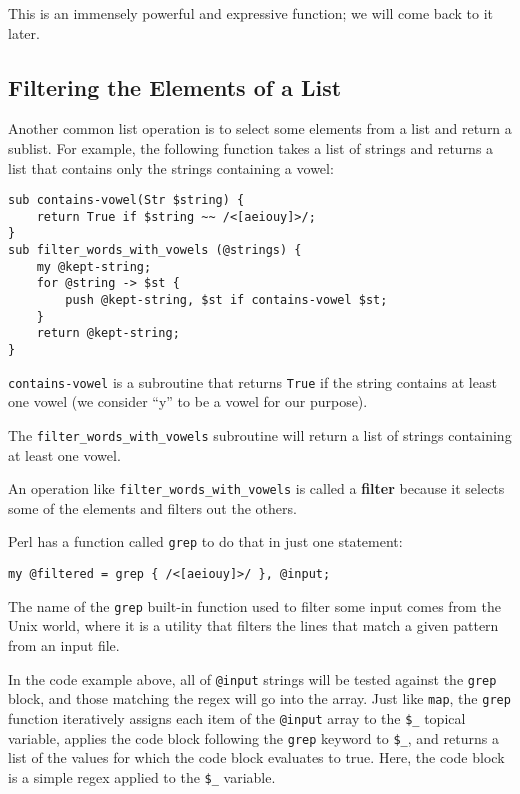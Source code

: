 This is an immensely 
powerful and expressive function; we will come back to it 
later.

\subsection{Filtering the Elements of a List}

Another common list operation is to select some elements from
a list and return a sublist.  For example, the following
function takes a list of strings and returns a list that 
contains only the strings containing a vowel:

\begin{verbatim}
sub contains-vowel(Str $string) {
    return True if $string ~~ /<[aeiouy]>/;
}
sub filter_words_with_vowels (@strings) {
    my @kept-string;
    for @string -> $st { 
        push @kept-string, $st if contains-vowel $st;
    }
    return @kept-string;
}  
\end{verbatim}
%

{\tt contains-vowel} is a subroutine that returns 
{\tt True} if the string contains at least one vowel 
(we consider ``y'' to be a vowel for our purpose).

The \verb"filter_words_with_vowels" subroutine will return 
a list of strings containing at least one vowel.

An operation like \verb"filter_words_with_vowels" is called 
a {\bf filter} because it selects some of the elements and 
filters out the others.

Perl has a function called {\tt grep} to do that in just 
one statement:

\begin{verbatim}
my @filtered = grep { /<[aeiouy]>/ }, @input;
\end{verbatim}
%

The name of the {\tt grep} built-in function used to 
filter some input comes from the Unix world, where it 
is a utility that filters the lines that 
match a given pattern from an input file.

In the code example above, all of \verb'@input' strings 
will be tested against the 
{\tt grep} block, and those matching the regex will go into the 
{\tt \@filtered} array. Just like {\tt map}, the {\tt grep} 
function iteratively assigns each item of the \verb"@input" 
array to the \verb'$_' topical variable, applies the 
code block following the {\tt grep} keyword to \verb'$_', 
and returns a list of the values for which the code block 
evaluates to true. Here, the code block is a simple regex 
applied to the \verb'$_' variable.


